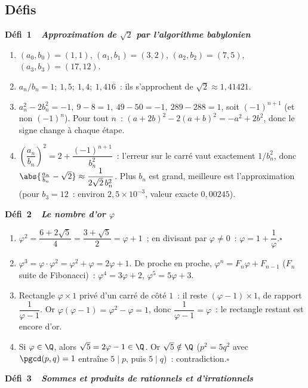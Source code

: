 \subsection*{D\'efis}

\noindent{}
{\color{BO}\bfseries\small D\'efi~1~\textendash\ \textit{Approximation de $\sqrt{2}$ par l'algorithme babylonien}}
\par\smallskip

\begin{enumerate}
  \item $(a_0,b_0)=(1,1)$, $(a_1,b_1)=(3,2)$, $(a_2,b_2)=(7,5)$, $(a_3,b_3)=(17,12)$.
  \item $a_n/b_n=1;\ 1{,}5;\ 1{,}4;\ 1{,}41\overline6$~: ils s'approchent de $\sqrt2\approx1{,}41421$.
  \item $a_n^2-2b_n^2=-1,\ 9-8=1,\ 49-50=-1,\ 289-288=1$, soit $(-1)^{n+1}$ (et non $(-1)^n$).
        Pour tout $n$~: $(a+2b)^2-2(a+b)^2=-a^2+2b^2$, donc le signe change \`a chaque \'etape.
  \item $\left(\dfrac{a_n}{b_n}\right)^2=2+\dfrac{(-1)^{n+1}}{b_n^2}$~: l'erreur sur le carr\'e vaut exactement $1/b_n^2$, donc $\abs{\tfrac{a_n}{b_n}-\sqrt2}\approx\dfrac1{2\sqrt2\,b_n^2}$.
        Plus $b_n$ est grand, meilleure est l'approximation (pour $b_3=12$~: environ $2{,}5\times10^{-3}$, valeur exacte $0{,}00245$).
\end{enumerate}
\noindent{}
{\color{BO}\bfseries\small D\'efi~2~\textendash\ \textit{Le nombre d'or $\varphi$}}
\par\smallskip

\begin{enumerate}
  \item $\varphi^2=\dfrac{6+2\sqrt5}{4}=\dfrac{3+\sqrt5}{2}=\varphi+1$~; en divisant par $\varphi\neq0$~: $\varphi=1+\dfrac1\varphi$.\hfill$\square$
  \item $\varphi^3=\varphi\cdot\varphi^2=\varphi^2+\varphi=2\varphi+1$. De proche en proche, $\varphi^n=F_n\varphi+F_{n-1}$ ($F_n$ suite de Fibonacci)~: $\varphi^4=3\varphi+2$, $\varphi^5=5\varphi+3$.
  \item Rectangle $\varphi\times1$ priv\'e d'un carr\'e de c\^ot\'e $1$~: il reste $(\varphi-1)\times1$, de rapport $\dfrac1{\varphi-1}$. Or $\varphi(\varphi-1)=\varphi^2-\varphi=1$, donc $\dfrac1{\varphi-1}=\varphi$~: le rectangle restant est encore d'or.
  \item Si $\varphi\in\Q$, alors $\sqrt5=2\varphi-1\in\Q$. Or $\sqrt5\notin\Q$ ($p^2=5q^2$ avec $\pgcd(p,q)=1$ entra\^ine $5\mid p$, puis $5\mid q$)~: contradiction.\hfill$\square$
\end{enumerate}
\noindent{}
{\color{BO}\bfseries\small D\'efi~3~\textendash\ \textit{Sommes et produits de rationnels et d'irrationnels}}
\par\smallskip

